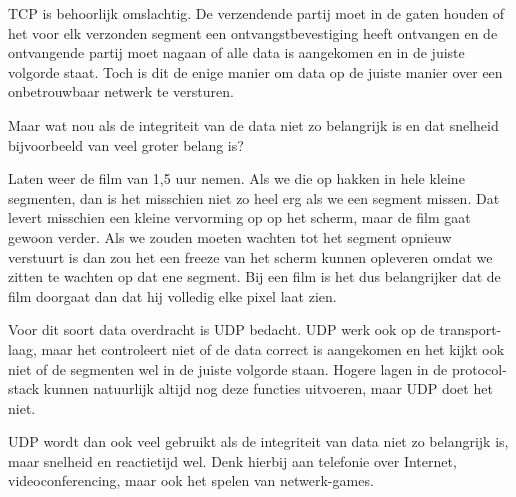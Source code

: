 TCP is behoorlijk omslachtig. De verzendende partij moet in de gaten houden of het voor elk verzonden segment een ontvangstbevestiging heeft ontvangen en de ontvangende partij moet nagaan of alle data is aangekomen en in de juiste volgorde staat. Toch is dit de enige manier om data op de juiste manier over een onbetrouwbaar netwerk te versturen.

Maar wat nou als de integriteit van de data niet zo belangrijk is en dat snelheid bijvoorbeeld van veel groter belang is?

Laten weer de film van 1,5 uur nemen. Als we die op hakken in hele kleine segmenten, dan is het misschien niet zo heel erg als we een segment missen. Dat levert misschien een kleine vervorming op op het scherm, maar de film gaat gewoon verder. Als we zouden moeten wachten tot het segment opnieuw verstuurt is dan zou het een freeze van het scherm kunnen opleveren omdat we zitten te wachten op dat ene segment. Bij een film is het dus belangrijker dat de film doorgaat dan dat hij volledig elke pixel laat zien.

Voor dit soort data overdracht is UDP bedacht. UDP werk ook op de transport-laag, maar het controleert niet of de data correct is aangekomen en het kijkt ook niet of de segmenten wel in de juiste volgorde staan. Hogere lagen in de protocol-stack kunnen natuurlijk altijd nog deze functies uitvoeren, maar UDP doet het niet.

UDP wordt dan ook veel gebruikt als de integriteit van data niet zo belangrijk is, maar snelheid en reactietijd wel. Denk hierbij aan telefonie over Internet, videoconferencing, maar ook het spelen van netwerk-games.
